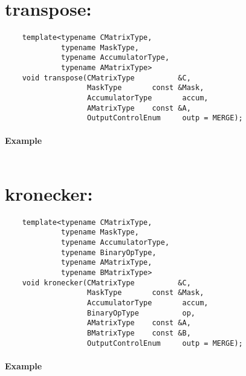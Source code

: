 \section{{\sf transpose}: }

\paragraph{\syntax}

\begin{verbatim}
    template<typename CMatrixType,
             typename MaskType,
             typename AccumulatorType,
             typename AMatrixType>
    void transpose(CMatrixType          &C,
                   MaskType       const &Mask,
                   AccumulatorType       accum,
                   AMatrixType    const &A,
                   OutputControlEnum     outp = MERGE);
\end{verbatim}


\paragraph{Example}

\begin{verbatim}

\end{verbatim}


\section{{\sf kronecker}: }

\paragraph{\syntax}

\begin{verbatim}
    template<typename CMatrixType,
             typename MaskType,
             typename AccumulatorType,
             typename BinaryOpType,
             typename AMatrixType,
             typename BMatrixType>
    void kronecker(CMatrixType          &C,
                   MaskType       const &Mask,
                   AccumulatorType       accum,
                   BinaryOpType          op,
                   AMatrixType    const &A,
                   BMatrixType    const &B,
                   OutputControlEnum     outp = MERGE);
\end{verbatim}


\paragraph{Example}

\begin{verbatim}

\end{verbatim}

